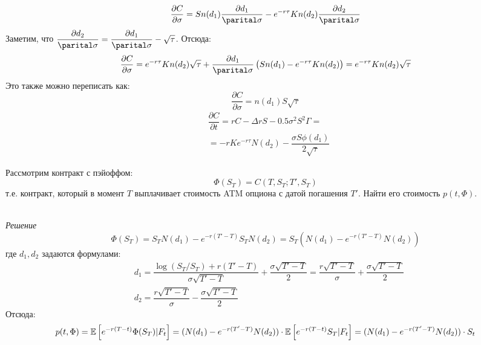 \documentclass[12pt]{article}
\begin{document}
$$
    \dfrac{\partial C}{\partial \sigma}
    = S n(d_1) \dfrac{\partial d_1}{\parital \sigma}
    - e^{-r\tau} K n(d_2) \dfrac{\partial d_2}{\parital \sigma}
$$Заметим, что $\dfrac{\partial d_2}{\parital \sigma}
= \dfrac{\partial d_1}{\parital \sigma} - \sqrt{\tau}$.
Отсюда:
$$
    \dfrac{\partial C}{\partial \sigma}
    = e^{-r\tau} K n(d_2) \sqrt{\tau}
    + \dfrac{\partial d_1}{\parital \sigma} \left( Sn(d_1) - e^{-r\tau} K n(d_2)\right)
    = e^{-r\tau} K n(d_2) \sqrt{\tau}
$$Это также можно переписать как:
$$
    \dfrac{\partial C}{\partial \sigma}
    = n(d_1) S \sqrt{\tau}
$$
\begin{align*}
    &\dfrac{\partial C}{\partial t}
    = rC - \Delta r S - 0.5 \sigma^2 S^2 \Gamma =\\
    &= -rK e^{-r\tau} N(d_2) - \dfrac{\sigma S \phi(d_1)}{2 \sqrt{\tau}}
\end{align*}
\begin{problem}
    Рассмотрим контракт с пэйоффом:
    $$
        \Phi(S_T) = C(T, S_T; T', S_T)
    $$т.е. контракт, который в момент $T$ выплачивает стоимость ATM опциона с датой погашения $T'$.
    Найти его стоимость $p(t, \Phi)$.
\end{problem}\\
\noindent \textit{Решение}
$$
    \Phi(S_T) = S_T N(d_1) - e^{-r(T'-T)}S_TN(d_2)
    = S_T (N(d_1) - e^{-r(T'-T)} N(d_2))
$$где $d_1, d_2$ задаются формулами:
\begin{align*}
    &d_1 = \dfrac{\log(S_T / S_T) + r(T'-T)}{\sigma \sqrt{T'-T}}
    + \dfrac{\sigma \sqrt{T'-T}}{2}
    = \dfrac{r\sqrt{T'-T}}{\sigma} + \dfrac{\sigma \sqrt{T'-T}}{2}\\
    &d_2 = \dfrac{r\sqrt{T'-T}}{\sigma} - \dfrac{\sigma \sqrt{T'-T}}{2}
\end{align*}
Отсюда:
$$
    p(t, \Phi) = \mathbb{E} \left[ e^{-r(T-t)} \Phi(S_T) | F_t \right]
    = (N(d_1) - e^{-r(T'-T)} N(d_2)) \cdot 
    \mathbb{E} \left[ e^{-r(T-t)} S_T | F_t \right]
    = (N(d_1) - e^{-r(T'-T)} N(d_2)) \cdot S_t
$$
\end{document}

